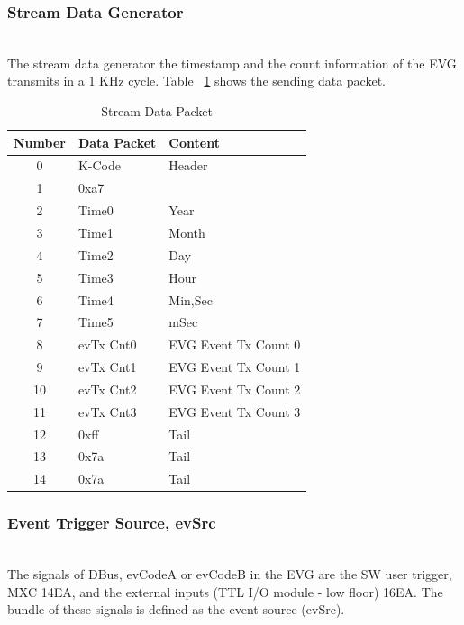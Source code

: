 \documentclass[journal,reqno]{IEEEtran}
\begin{document}
\subsubsection{Stream Data Generator}\hspace*{\fill} \\
The stream data generator the timestamp and the count information of the EVG transmits in a 1 KHz cycle.
Table ~\ref{stream_data_packet} shows the sending data packet.

\begin{table}[h!t]
	\centering
	\caption{Stream Data Packet}
	\label{stream_data_packet}
	
	\begin{tabular}{@{}cll@{}}
		
		\hline
		\textbf{Number}	& \textbf{Data Packet}			& \textbf{Content}\\
		\hline
		0				& K-Code						& Header\\
		1				& 0xa7			                &\\
		\hline
		2				& Time0							& Year\\
		3				& Time1                         & Month\\
		4				& Time2                         & Day\\
		5				& Time3                         & Hour\\
		6				& Time4                         & Min,Sec\\
		7				& Time5                         & mSec\\								
		\hline
		8				& evTx Cnt0						& EVG Event Tx Count 0\\        
		9				& evTx Cnt1						& EVG Event Tx Count 1\\        
		10				& evTx Cnt2						& EVG Event Tx Count 2\\        
		11				& evTx Cnt3						& EVG Event Tx Count 3\\        
		12				& 0xff							& Tail\\        
		13				& 0x7a							& Tail\\        								
		14				& 0x7a							& Tail\\        								
		\hline
	\end{tabular}
\end{table}

\subsubsection{Event Trigger Source, evSrc}\hspace*{\fill} \\
The signals of DBus, evCodeA or evCodeB in the EVG are the SW user trigger, MXC 14EA, and the external inputs (TTL I/O module - low floor) 16EA. The bundle of these signals is defined as the event source (evSrc).
\end{document}
